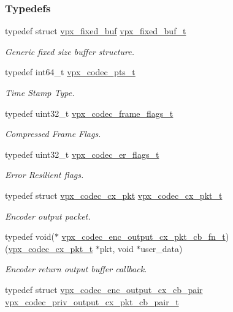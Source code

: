 \subsubsection*{Typedefs}
\begin{DoxyCompactItemize}
\item 
typedef struct \hyperlink{structvpx__fixed__buf}{vpx\+\_\+fixed\+\_\+buf} \hyperlink{group__encoder_ga21fab7dd28065f349c97165501223764}{vpx\+\_\+fixed\+\_\+buf\+\_\+t}
\begin{DoxyCompactList}\small\item\em Generic fixed size buffer structure. \end{DoxyCompactList}\item 
typedef int64\+\_\+t \hyperlink{group__encoder_ga7e711b0a71c65aef8f0faea8bd57b05f}{vpx\+\_\+codec\+\_\+pts\+\_\+t}
\begin{DoxyCompactList}\small\item\em Time Stamp Type. \end{DoxyCompactList}\item 
typedef uint32\+\_\+t \hyperlink{group__encoder_gaac8ee319b9a6175f6946f59437c7ae4b}{vpx\+\_\+codec\+\_\+frame\+\_\+flags\+\_\+t}
\begin{DoxyCompactList}\small\item\em Compressed Frame Flags. \end{DoxyCompactList}\item 
typedef uint32\+\_\+t \hyperlink{group__encoder_ga77e0e1fff62556a4f4d54c84467a41f3}{vpx\+\_\+codec\+\_\+er\+\_\+flags\+\_\+t}
\begin{DoxyCompactList}\small\item\em Error Resilient flags. \end{DoxyCompactList}\item 
typedef struct \hyperlink{structvpx__codec__cx__pkt}{vpx\+\_\+codec\+\_\+cx\+\_\+pkt} \hyperlink{group__encoder_ga3f711e17fbefac545e8959ef5a023556}{vpx\+\_\+codec\+\_\+cx\+\_\+pkt\+\_\+t}
\begin{DoxyCompactList}\small\item\em Encoder output packet. \end{DoxyCompactList}\item 
typedef void($\ast$ \hyperlink{group__encoder_gaab1213b7c5f36eb382f736ab919767e6}{vpx\+\_\+codec\+\_\+enc\+\_\+output\+\_\+cx\+\_\+pkt\+\_\+cb\+\_\+fn\+\_\+t}) (\hyperlink{group__encoder_ga3f711e17fbefac545e8959ef5a023556}{vpx\+\_\+codec\+\_\+cx\+\_\+pkt\+\_\+t} $\ast$pkt, void $\ast$user\+\_\+data)
\begin{DoxyCompactList}\small\item\em Encoder return output buffer callback. \end{DoxyCompactList}\item 
typedef struct \hyperlink{structvpx__codec__enc__output__cx__cb__pair}{vpx\+\_\+codec\+\_\+enc\+\_\+output\+\_\+cx\+\_\+cb\+\_\+pair} \hyperlink{group__encoder_gac8a2ccecf20463a7bd52bad87410ba45}{vpx\+\_\+codec\+\_\+priv\+\_\+output\+\_\+cx\+\_\+pkt\+\_\+cb\+\_\+pair\+\_\+t}\hypertarget{group__encoder_gac8a2ccecf20463a7bd52bad87410ba45}{}\label{group__encoder_gac8a2ccecf20463a7bd52bad87410ba45}


\end{DoxyCompactItemize}
